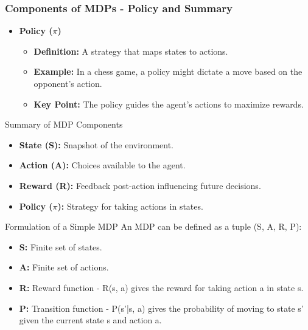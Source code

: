 \documentclass[aspectratio=169]{beamer}
\begin{document}
\begin{frame}[fragile]
    \frametitle{Components of MDPs - Policy and Summary}
    \begin{itemize}
        \item \textbf{Policy ($\pi$)}
        \begin{itemize}
            \item \textbf{Definition:} A strategy that maps states to actions.
            \item \textbf{Example:} In a chess game, a policy might dictate a move based on the opponent's action.
            \item \textbf{Key Point:} The policy guides the agent's actions to maximize rewards.
        \end{itemize}
    \end{itemize}

    \begin{block}{Summary of MDP Components}
        \begin{itemize}
            \item \textbf{State (S):} Snapshot of the environment.
            \item \textbf{Action (A):} Choices available to the agent.
            \item \textbf{Reward (R):} Feedback post-action influencing future decisions.
            \item \textbf{Policy ($\pi$):} Strategy for taking actions in states.
        \end{itemize}
    \end{block}

    \begin{block}{Formulation of a Simple MDP}
        An MDP can be defined as a tuple (S, A, R, P):
        \begin{itemize}
            \item \textbf{S:} Finite set of states.
            \item \textbf{A:} Finite set of actions.
            \item \textbf{R:} Reward function - R(s, a) gives the reward for taking action a in state s.
            \item \textbf{P:} Transition function - P(s'|s, a) gives the probability of moving to state s' given the current state s and action a.
        \end{itemize}
    \end{block}
\end{frame}
\end{document}
